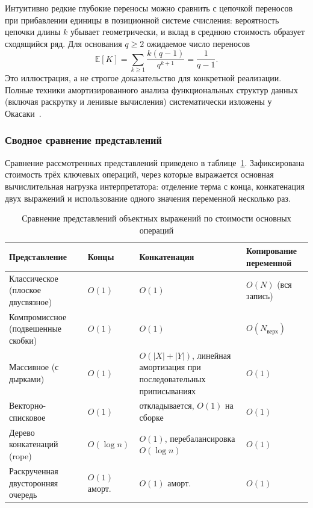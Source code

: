 \documentclass[14pt, russian]{scrartcl}
\renewcommand{\emph}[1]{#1}
\begin{document}
Интуитивно редкие глубокие переносы можно сравнить с цепочкой переносов
при прибавлении единицы в позиционной системе счисления: вероятность
цепочки длины \(k\) убывает геометрически, и вклад в \emph{среднюю}
стоимость образует сходящийся ряд. Для основания \(q \ge 2\) ожидаемое
число переносов
\[
  \mathbb{E}[K] = \sum_{k\ge 1} \frac{k(q-1)}{q^{k+1}} = \frac{1}{q-1}.
\]
Это иллюстрация, а не строгое доказательство для конкретной реализации.
Полные техники амортизированного анализа функциональных структур данных
(включая раскрутку и ленивые вычисления) систематически изложены у
Окасаки~\cite{okasaki_pfds}.

\subsubsection{Сводное сравнение представлений}

Сравнение рассмотренных представлений приведено в
таблице~\ref{tab:repr-comparison}. Зафиксирована стоимость трёх ключевых
операций, через которые выражается основная вычислительная нагрузка
интерпретатора: отделение терма с конца, конкатенация двух выражений и
использование одного значения переменной несколько раз.

\begin{table}[!htb]
\caption{\centering Сравнение представлений объектных выражений по стоимости основных операций}
\label{tab:repr-comparison}
\small
\centering
\begin{tabular}{@{}p{4.2cm}p{2.4cm}p{3.0cm}p{3.4cm}@{}}
\toprule
\textbf{Представление} & \textbf{Концы} & \textbf{Конкатенация} & \textbf{Копирование переменной} \\
\midrule
Классическое (плоское двусвязное) & \(O(1)\) & \(O(1)\) & \(O(N)\) (вся запись) \\
Компромиссное (подвешенные скобки) & \(O(1)\) & \(O(1)\) & \(O(N_{\text{верх}})\) \\
Массивное (с дырками) & \(O(1)\) & \(O(|X|+|Y|)\), линейная амортизация при последовательных приписываниях & \(O(1)\) \\
Векторно-списковое & \(O(1)\) & откладывается, \(O(1)\) на сборке & \(O(1)\) \\
Дерево конкатенаций (rope) & \(O(\log n)\) & \(O(1)\), перебалансировка \(O(\log n)\) & \(O(1)\) \\
Раскрученная двусторонняя очередь & \(O(1)\) аморт. & \(O(1)\) аморт. & \(O(1)\) \\
\bottomrule
\end{tabular}
\end{table}
\end{document}
